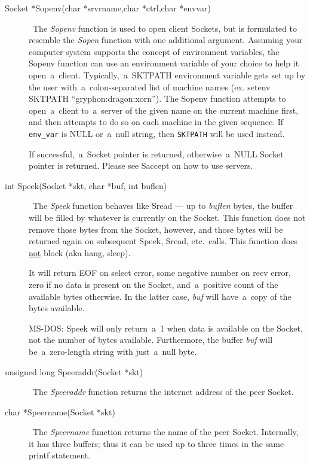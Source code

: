 \documentclass[12pt]{article}
\begin{document}
\begin{description}
\item[Socket *Sopenv(char *srvrname,char *ctrl,char *envvar)] \     The {\em Sopenv} function is used to open client Sockets, but is formulated
    to resemble the {\em Sopen} function with one additional argument.
    Assuming your computer system supports the concept of environment
    variables, the Sopenv function can use an environment variable of your
    choice to help it open~a~client.  Typically,~a~{\small SKTPATH} environment
    variable gets set up by the user with~a~colon-separated list of machine
    names (ex. setenv {\small SKTPATH} ``gryphon:dragon:xorn'').  The Sopenv
    function attempts to open~a~client to~a~server of the given name on the
    current machine first, and then attempts to do so on each machine in the
    given sequence.  If \verb`env_var` is NULL or~a~null string, then
    \verb`SKTPATH` will be used instead.

    If successful,~a~Socket pointer is returned, otherwise~a~{\small NULL}
    Socket pointer is returned.  Please see Saccept on how to use servers.

\item[int Speek(Socket *skt, char *buf, int buflen)] \     The {\em Speek} function behaves like Sread --- up to {\em buflen} bytes,
    the buffer will be filled by whatever is currently on the Socket.  This
    function does not remove those bytes from the Socket, however, and those
    bytes will be returned again on subsequent Speek, Sread, etc.\ calls.  This
    function does \underline{not} block (aka hang, sleep).

    It will return EOF on select error, some negative number on recv error,
    zero if no data is present on the Socket, and~a~positive count of the
    available bytes otherwise.  In the latter case, {\em buf} will have~a~copy
    of the bytes available.

    {\small MS-DOS}: Speek will only return~a~1 when data is available on
    the Socket, not the number of bytes available.  Furthermore, the buffer
    {\em buf} will be~a~zero-length string with just~a~null byte.

\item[unsigned long Speeraddr(Socket *skt)] \     The {\em Speeraddr} function returns the internet address of the
    peer Socket.

\item[char *Speername(Socket *skt)] \     The {\em Speername} function returns the name of the peer Socket.
    Internally, it has three buffers; thus it can be used up to three times
    in the same printf statement.


\end{description}
\end{document}
